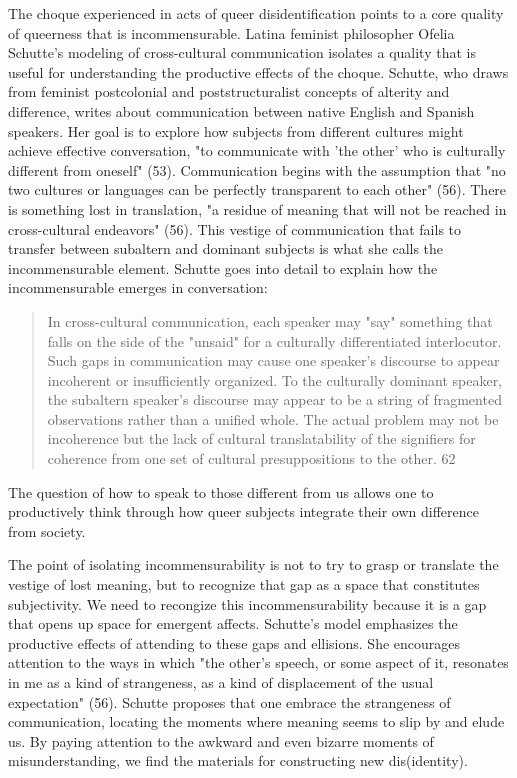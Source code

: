 \documentclass[11pt]{article}
\begin{document}
The choque experienced in acts of queer disidentification points to a
core quality of queerness that is incommensurable. Latina feminist
philosopher Ofelia Schutte's modeling of cross-cultural
communication isolates a quality that is useful for understanding the
productive effects of the choque. Schutte, who draws from feminist
postcolonial and poststructuralist concepts of alterity and
difference, writes about communication between native English and
Spanish speakers. Her goal is to explore how subjects from different
cultures might achieve effective conversation, "to communicate with
'the other' who is culturally different from oneself"
(53). Communication begins with the assumption that "no two cultures
or languages can be perfectly transparent to each other" (56). There
is something lost in translation, "a residue of meaning that will not
be reached in cross-cultural endeavors" (56). This vestige of
communication that fails to transfer between subaltern and dominant
subjects is what she calls the incommensurable element. Schutte goes
into detail to explain how the incommensurable emerges in
conversation:

\begin{quote}
In cross-cultural communication, each speaker may "say" something that
falls on the side of the "unsaid" for a culturally differentiated
interlocutor. Such gaps in communication may cause one speaker's
discourse to appear incoherent or insufficiently organized. To the
culturally dominant speaker, the subaltern speaker's discourse may
appear to be a string of fragmented observations rather than a unified
whole. The actual problem may not be incoherence but the lack of
cultural translatability of the signifiers for coherence from one set
of cultural presuppositions to the other. 62
\end{quote}

The question of how to speak to those different from us allows one to
productively think through how queer subjects integrate their own
difference from society.

The point of isolating incommensurability is not to try to grasp or
translate the vestige of lost meaning, but to recognize that gap as a
space that constitutes subjectivity. We need to recongize this
incommensurability because it is a gap that opens up space for
emergent affects. Schutte's model emphasizes the productive effects of
attending to these gaps and ellisions. She encourages attention to the
ways in which "the other's speech, or some aspect of it, resonates in
me as a kind of strangeness, as a kind of displacement of the usual
expectation" (56). Schutte proposes that one embrace the strangeness
of communication, locating the moments where meaning seems to slip by
and elude us. By paying attention to the awkward and even bizarre
moments of misunderstanding, we find the materials for constructing
new dis(identity).
\end{document}
